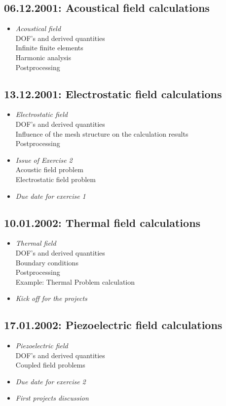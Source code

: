 \subsection*{06.12.2001: Acoustical field calculations}
%
\begin{itemize}
\item{\em Acoustical field}\\
DOF's and derived quantities\\
Infinite finite elements\\
Harmonic analysis\\
Postprocessing
\end{itemize}
%
\subsection*{13.12.2001: Electrostatic field calculations}
%
\begin{itemize}
\item{\em Electrostatic field}\\
DOF's and derived quantities\\
Influence of the mesh structure on the calculation results\\
Postprocessing
\item{\em Issue of Exercise 2}\\
Acoustic field problem\\
Electrostatic field problem
\item{\em Due date for exercise 1}
\end{itemize}
%
\newslide
%
\subsection*{10.01.2002: Thermal field calculations}
%
\begin{itemize}
\item{\em Thermal field}\\
DOF's and derived quantities\\
Boundary conditions\\
Postprocessing\\
Example: Thermal Problem calculation
\item{\em Kick off for the projects}
\end{itemize}
%
\subsection*{17.01.2002: Piezoelectric field calculations}
%
\begin{itemize}
\item{\em Piezoelectric field}\\
DOF's and derived quantities\\
Coupled field problems
\item{\em Due date for exercise 2}
\item{\em First projects discussion}
\end{itemize}
%
\newslide
%
